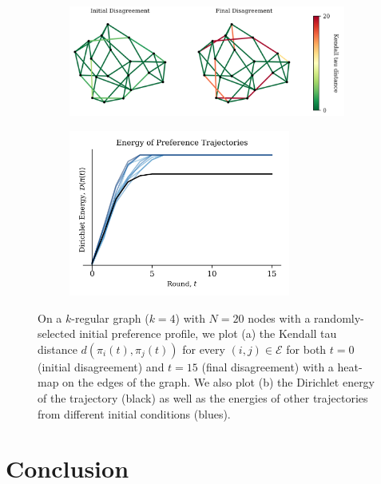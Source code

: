 \documentclass[conference]{ieeeconf}
\newcommand{\E}{\mathcal{E}}
\begin{document}
\begin{figure}[ht]
    \begin{subfigure}[b]{0.6\textwidth}
    \includegraphics[width=\textwidth]{figs/fig2alt.png}
    \caption{}
    \label{fig:2a}
    \end{subfigure}
    \hfill
    \begin{subfigure}[b]{0.4\textwidth}
    \centering
    \includegraphics[width=0.8\textwidth]{figs/fig2balt.png}
    \caption{}
    \label{fig:2b}
    \end{subfigure}
    \caption{On a $k$-regular graph ($k=4$) with $N =20$ nodes with a randomly-selected initial preference profile, we plot (a) the Kendall tau distance $d(\pi_i(t),\pi_j(t))$ for every $(i,j) \in \E$ for both $t=0$ (initial disagreement) and $t=15$ (final disagreement) with a heat-map on the edges of the graph. We also plot (b) the Dirichlet energy of the trajectory (black) as well as the energies of other trajectories from different initial conditions (blues).}
    \label{fig:2}
    \vspace{-1em}
\end{figure}

\section{Conclusion}
\end{document}
